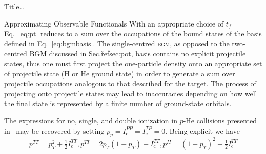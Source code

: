 \documentclass[letterpaper, 11 pt]{report}
\begin{document}
\begin{chapter}{ Title\dots \label{chap:p-he2p-he}}
\begin{section}{Approximating Observable Functionals \label{sec:phe2p-obs}}
      With an appropriate choice of $t_f$ Eq.~\eqref{eq:pt} reduces to a sum over the occupations of the
      bound states of the basis defined in Eq.~\eqref{eq:bgmbasis}. The single-centred \textsc{bgm}, as
      opposed to the two-centred \textsc{BGM} discussed in Sec.\~ref{sec:pot}, basis contains no
      explicit projectile states, thus one must first project the one-particle density onto an
      appropriate set of projectile state (H or He ground state) in order to generate a sum over
      projectile occupations analogous to that described for the target. The process of projecting onto
      projectile states may lead to inaccuracies depending on how well the final state is represented by
      a finite number of ground-state orbitals.

      The expressions for no, single, and double ionization in $\bar{p}$-He collisions presented
      in~\cite{pbarhe} may be recovered by setting $p_p = I^{PP}_\mathrm{c} = I^{TP}_\mathrm{c} = 0$.
      Being explicit we have
      \begin{subequations} \label{eq:prob-pbarhe}
         \begin{equation} \label{eq:ptt-pbarhe}
            p^{TT} = p_T^2 + \tfrac{1}{2} I^{TT}_\mathrm{c},
         \end{equation}
         \begin{equation} \label{eq:pti-pbarhe}
            p^{TI} = 2p_T(1 - p_T) - I^{TT}_\mathrm{c},
         \end{equation}
         \begin{equation} \label{eq:pii-pbarhe}
            p^{II} = (1 - p_T)^2 + \tfrac{1}{2} I^{TT}_\mathrm{c}
         \end{equation}
      \end{subequations}


\end{section}
\end{chapter}
\end{document}
